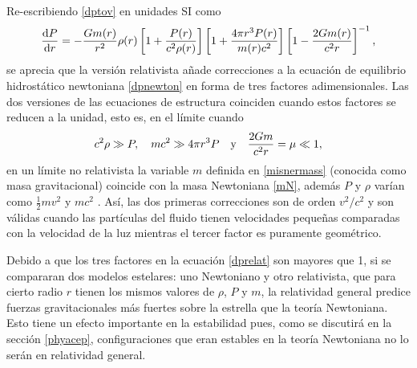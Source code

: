 Re-escribiendo \eqref{dptov} en unidades SI como
\begin{equation}
    \dv{P}{r} =  - \frac { G  m ( r ) } { r ^ { 2 } } \rho ( r ) \left[ 1 + \frac { P ( r ) } {c ^ { 2 } \rho ( r ) } \right] \left[ 1 + \frac { 4 \pi r ^ { 3 } P ( r ) } { m ( r ) c ^ { 2 } } \right]  \left[ 1 - \frac { 2 G m ( r ) } { c ^ { 2 } r } \right] ^ { - 1 }, 
    \label{dprelat}
\end{equation}
se aprecia que la versión relativista añade correcciones a la ecuación de equilibrio hidrostático newtoniana \eqref{dpnewton} en forma de tres factores adimensionales. Las dos versiones de las ecuaciones de estructura coinciden cuando estos factores se reducen a la unidad, esto es, en el límite cuando 
\begin{equation}
    c^2\rho \gg P \qc mc^2 \gg 4\pi r^3P \quad \text{y} \quad  \frac{2Gm}{c^2r}= \mu \ll 1,
\end{equation}
en un límite no relativista la variable $m$ definida en \eqref{misnermass} (conocida como masa gravitacional)  coincide con la masa Newtoniana \eqref{mN}, además $P$ y $\rho$ varían como $\frac{1}{2}mv^2$ y  $mc^2$ \cite{Silbar2003}. Así, las dos primeras correcciones son de orden $v^2/c^2$ y son válidas cuando las partículas del fluido tienen velocidades pequeñas comparadas con la velocidad de la luz mientras el tercer factor es puramente geométrico. 

Debido a que los tres factores en la ecuación \eqref{dprelat} son mayores que 1, si se compararan dos modelos estelares: uno Newtoniano y otro relativista, que para cierto radio $r$ tienen los mismos valores de $\rho$, $P$ y $m$, la relatividad general predice fuerzas gravitacionales más fuertes sobre la estrella que la teoría Newtoniana. Esto tiene un efecto importante en la estabilidad pues, como se discutirá en la sección \ref{phyacep}, configuraciones que eran estables en la teoría Newtoniana no lo serán en relatividad general. 

